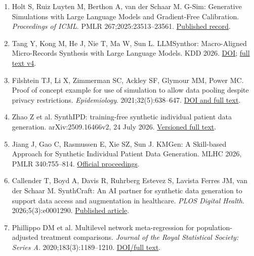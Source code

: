 \documentclass[sigconf,anonymous,nonacm]{acmart}
\begin{document}
\begin{enumerate}\setlength{\itemsep}{.12em}

\item Holt S, Ruiz Luyten M, Berthon A, van der Schaar M. G-Sim: Generative Simulations with Large Language Models and Gradient-Free Calibration. \emph{Proceedings of ICML}. PMLR 267;2025:23513–\allowbreak{}23561. \href{https://proceedings.mlr.press/v267/holt25b.html}{Published record}.

\item Tang Y, Kong M, He J, Nie T, Ma W, Sun L. LLMSynthor: Macro-Aligned Micro-Records Synthesis with Large Language Models. KDD 2026. \href{https://doi.org/10.1145/3770855.3818965}{DOI}; \href{https://arxiv.org/html/2505.14752v4}{full text v4}.

\item Filshtein TJ, Li X, Zimmerman SC, Ackley SF, Glymour MM, Power MC. Proof of concept example for use of simulation to allow data pooling despite privacy restrictions. \emph{Epidemiology}. 2021;32(5):638–\allowbreak{}647. \href{https://pmc.ncbi.nlm.nih.gov/articles/PMC8338788/}{DOI and full text}.

\item Zhao Z et al. SynthIPD: training-free synthetic individual patient data generation. arXiv:2509.16466v2, 24 July 2026. \href{https://arxiv.org/html/2509.16466v2}{Versioned full text}.

\item Jiang J, Gao C, Rasmussen E, Xie SZ, Sun J. KMGen: A Skill-based Approach for Synthetic Individual Patient Data Generation. MLHC 2026, PMLR 340:755–\allowbreak{}814. \href{https://proceedings.mlr.press/v340/jiang26a.html}{Official proceedings}.

\item Callender T, Boyd A, Davis R, Ruhrberg Estevez S, Lavista Ferres JM, van der Schaar M. SynthCraft: An AI partner for synthetic data generation to support data access and augmentation in healthcare. \emph{PLOS Digital Health}. 2026;5(3):e0001290. \href{https://journals.plos.org/digitalhealth/article?id=10.1371/journal.pdig.0001290}{Published article}.

\item Phillippo DM et al. Multilevel network meta-regression for population-adjusted treatment comparisons. \emph{Journal of the Royal Statistical Society: Series A}. 2020;183(3):1189–\allowbreak{}1210. \href{https://rss.onlinelibrary.wiley.com/doi/full/10.1111/rssa.12579}{DOI/\allowbreak{}full text}.


\end{enumerate}
\end{document}

